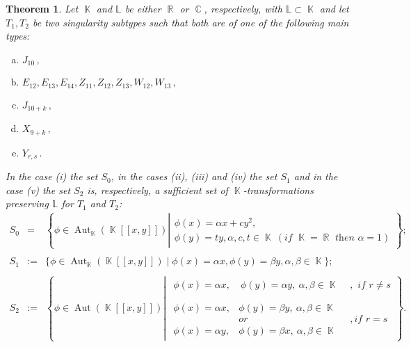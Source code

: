 \documentclass[noend]{amsproc}
\newtheorem{theorem}{Theorem}
\theoremstyle{definition}
\DeclareMathOperator{\R}{\mathbb{R}}
\DeclareMathOperator{\C}{\mathbb{C}}
\DeclareMathOperator{\K}{\mathbb{K}}
\DeclareMathOperator{\Aut}{Aut}
\begin{document}
\begin{theorem}\label{tab:sufficient_sets}\label{thm:sufficient_sets}
Let $\K$ and $\mathbb L$ be either $\R$ or $\C$, respectively, with $\mathbb L\subset \K$ and let $T_1,T_2$ be two singularity subtypes such that both are of one of the following main types:
\begin{enumerate}[(a)]
\item[(i)] $J_{10}\,,$
\item[(ii)] $E_{12},E_{13},E_{14},Z_{11},Z_{12},Z_{13},W_{12},W_{13}\,,$
\item[(iii)] $ J_{10+k}\,,$ 
\item[(iv)] $X_{9+k}\,,$
\item[(v)] $Y_{r,s}\,.$
\end{enumerate}
In the case (i) the set $S_0$, in the cases (ii), (iii) and (iv) the set $S_1$ and in the case (v) the set $S_2$ is, respectively, a sufficient set of $\K$-transformations preserving $\mathbb L$ for $T_1$ and $T_2$:
\begin{eqnarray*}
S_0&=&\left\{\phi\in\Aut_{\K}(\K[[x,y]])\left |\begin{array}{l}\phi(x)=\alpha x+cy^2,\\\phi(y)=ty, \alpha,c,t\in\K\ (\textit{if $\K=\R$ then $\alpha=1$})\end{array}\right.\right\};\\\\
S_1&:=&\{\phi\in\Aut_{\K}(\K[[x,y]]) \mid \phi(x)=\alpha x, \phi(y)=\beta y, \alpha, \beta\in\K\};\\\\
S_2&:=&\left\{\phi\in\Aut({\K}[[x,y]]) \left |
\begin{array}{ll}\begin{array}{l}\phi(x)=\alpha x,\quad \phi(y)=\alpha y,\ \alpha,\beta\in\K\end{array}&, \textit{ if $r\neq s$}\\\\
\begin{array}{ll}\phi(x)=\alpha x,& \phi(y)=\beta y,\ \alpha,\beta\in\K\\&\textit{or}\\
                        \phi(x)=\alpha y,& \phi(y)=\beta x,\ \alpha,\beta\in\K\end{array}&,\textit{if $r=s$}\end{array}\right.\right\}.
\end{eqnarray*}
\end{theorem}
\end{document}
